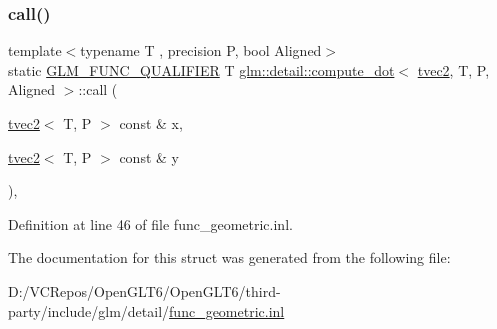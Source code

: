 \subsubsection{\texorpdfstring{call()}{call()}}
{\footnotesize\ttfamily template$<$typename T , precision P, bool Aligned$>$ \\
static \mbox{\hyperlink{setup_8hpp_a33fdea6f91c5f834105f7415e2a64407}{G\+L\+M\+\_\+\+F\+U\+N\+C\+\_\+\+Q\+U\+A\+L\+I\+F\+I\+ER}} T \mbox{\hyperlink{structglm_1_1detail_1_1compute__dot}{glm\+::detail\+::compute\+\_\+dot}}$<$ \mbox{\hyperlink{structglm_1_1tvec2}{tvec2}}, T, P, Aligned $>$\+::call (\begin{DoxyParamCaption}\item[{\mbox{\hyperlink{structglm_1_1tvec2}{tvec2}}$<$ T, P $>$ const \&}]{x,  }\item[{\mbox{\hyperlink{structglm_1_1tvec2}{tvec2}}$<$ T, P $>$ const \&}]{y }\end{DoxyParamCaption})\hspace{0.3cm}{\ttfamily [inline]}, {\ttfamily [static]}}



Definition at line 46 of file func\+\_\+geometric.\+inl.



The documentation for this struct was generated from the following file\+:\begin{DoxyCompactItemize}
\item 
D\+:/\+V\+C\+Repos/\+Open\+G\+L\+T6/\+Open\+G\+L\+T6/third-\/party/include/glm/detail/\mbox{\hyperlink{func__geometric_8inl}{func\+\_\+geometric.\+inl}}\end{DoxyCompactItemize}
